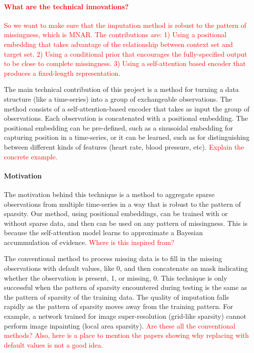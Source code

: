 \documentclass[a4paper,12pt,twoside,openright]{report}
\newcommand{\crit}[1]{\textcolor{red}{#1}}
\begin{document}
\crit{\paragraph{What are the technical innovations?} So we want to make sure that the imputation method is robust to the pattern of missingness, which is MNAR. The contributions are: 1) Using a positional embedding that takes advantage of the relationship between context set and target set. 2) Using a conditional prior that encourages the fully-specified output to be close to complete missingness. 3) Using a self-attention based encoder that produces a fixed-length representation.}

The main technical contribution of this project is a method for turning a data structure (like a time-series) into a group of exchangeable observations. The method consists of a self-attention-based encoder that takes as input the group of observations. Each observation is concatenated with a positional embedding. The positional embedding can be pre-defined, such as a sinusoidal embedding for capturing position in a time-series, or it can be learned, such as for distinguishing between different kinds of features (heart rate, blood pressure, etc). \crit{Explain the concrete example.}

\paragraph{Motivation} The motivation behind this technique is a method to aggregate sparse observations from multiple time-series in a way that is robust to the pattern of sparsity. Our method, using positional embeddings, can be trained with or without sparse data, and then can be used on any pattern of missingness. This is because the self-attention model learns to approximate a Bayesian accummulation of evidence. \crit{Where is this inspired from? \parencite{ilseAttentionbasedDeepMultiple2018}}

The conventional method to process missing data is to fill in the missing observations with default values, like 0, and then concatenate an mask indicating whether the observation is present, 1, or missing, 0. This technique is only successful when the pattern of sparsity encountered during testing is the same as the pattern of sparsity of the training data. The quality of imputation falls rapidly as the pattern of sparsity moves away from the training pattern. For example, a network trained for image super-resolution (grid-like sparsity) cannot perform image inpainting (local area sparsity). \crit{Are these all the conventional methods? Also, here is a place to mention the papers showing why replacing with default values is not a good idea.}
\end{document}
